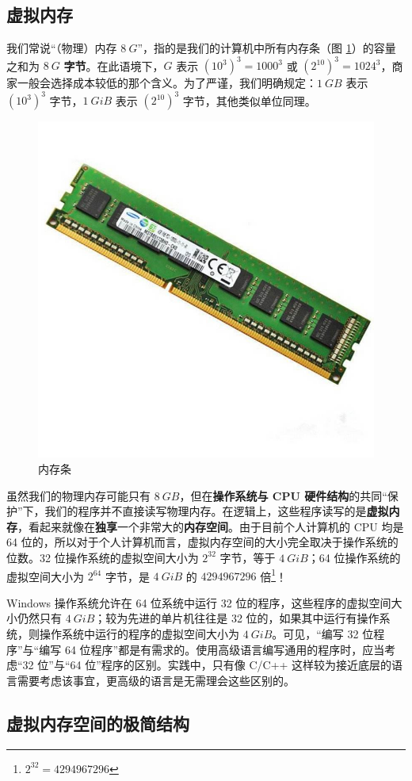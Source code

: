 \subsection{虚拟内存}

我们常说“（物理）内存 $\SI{8}{G}$”，指的是我们的计算机中所有内存条（图 \ref{pic:ddr}）的容量之和为 $\SI{8}{G}$ \textbf{字节}。在此语境下，$\si{G}$ 表示 $(10^3)^3 = 1000^3$ 或 $(2^{10})^3 = 1024^3$，商家一般会选择成本较低的那个含义。为了严谨，我们明确规定：$\SI{1}{GB}$ 表示 $(10^3)^3$ 字节，$\SI{1}{GiB}$ 表示 $(2^{10})^3$ 字节，其他类似单位同理。

\begin{figure}[ht]
	\centering
	\includegraphics[width=0.5\linewidth]{pic/ddr.png}
	\caption{内存条}
	\label{pic:ddr}
\end{figure}

虽然我们的物理内存可能只有 $\SI{8}{GB}$，但在\textbf{操作系统与 CPU 硬件结构}的共同“保护”下，我们的程序并不直接读写物理内存。在逻辑上，这些程序读写的是\textbf{虚拟内存}，看起来就像在\textbf{独享}一个非常大的\textbf{内存空间}。由于目前个人计算机的 CPU 均是 64 位的，所以对于个人计算机而言，虚拟内存空间的大小完全取决于操作系统的位数。32 位操作系统的虚拟空间大小为 $2^{32}$ 字节，等于 $\SI{4}{GiB}$；64 位操作系统的虚拟空间大小为 $2^{64}$ 字节，是 $\SI{4}{GiB}$ 的 $4294967296$ 倍\footnote{$2^{32} = 4294967296$}！

Windows 操作系统允许在 64 位系统中运行 32 位的程序，这些程序的虚拟空间大小仍然只有 $\SI{4}{GiB}$；较为先进的单片机往往是 32 位的，如果其中运行有操作系统，则操作系统中运行的程序的虚拟空间大小为 $\SI{4}{GiB}$。可见，“编写 32 位程序”与“编写 64 位程序”都是有需求的。使用高级语言编写通用的程序时，应当考虑“32 位”与“64 位”程序的区别。实践中，只有像 C/C++ 这样较为接近底层的语言需要考虑该事宜，更高级的语言是无需理会这些区别的。

\subsection{虚拟内存空间的极简结构}

